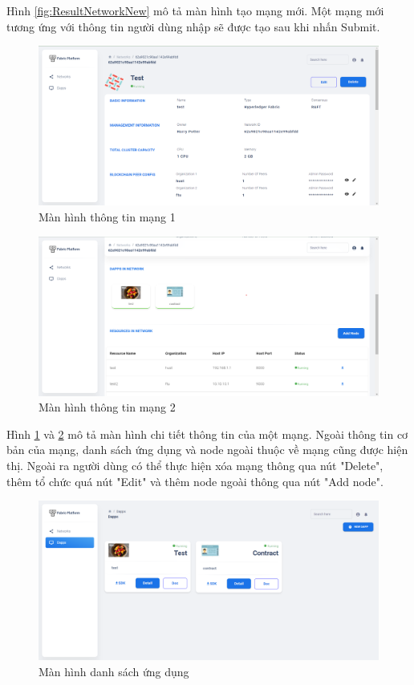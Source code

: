 \documentclass[../DoAn.tex]{subfiles}
\begin{document}
Hình \ref{fig:ResultNetworkNew} mô tả màn hình tạo mạng mới. Một mạng mới tương
ứng với thông tin người dùng nhập sẽ được tạo sau khi nhấn Submit.

\begin{figure}[H]
    \centering
    \includegraphics[width=0.75\linewidth]{Hinhve/DoAn-ResultNetworkDetail1.png}
    \caption{Màn hình thông tin mạng 1}
    \label{fig:ResultNetworkDetail1}
\end{figure}

\begin{figure}[H]
    \centering
    \includegraphics[width=0.75\linewidth]{Hinhve/DoAn-ResultNetworkDetail2.png}
    \caption{Màn hình thông tin mạng 2}
    \label{fig:ResultNetworkDetail2}
\end{figure}

Hình \ref{fig:ResultNetworkDetail1} và \ref{fig:ResultNetworkDetail2} mô tả màn
hình chi tiết thông tin của một mạng. Ngoài thông tin cơ bản của mạng, danh
sách ứng dụng và node ngoài thuộc về mạng cũng được hiện thị. Ngoài ra người
dùng có thể thực hiện xóa mạng thông qua nút "Delete", thêm tổ chức quá nút
"Edit" và thêm node ngoài thông qua nút "Add node".

\begin{figure}[H]
    \centering
    \includegraphics[width=0.75\linewidth]{Hinhve/DoAn-ResultDapps.png}
    \caption{Màn hình danh sách ứng dụng}
    \label{fig:ResultDapps}
\end{figure}
\end{document}
